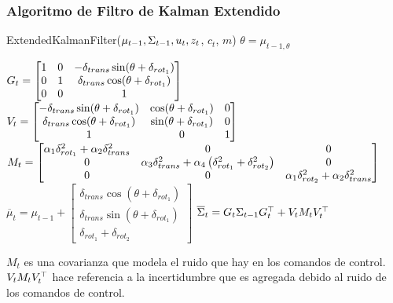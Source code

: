 \begin{frame}
    \frametitle{Algoritmo de Filtro de Kalman Extendido}
    \footnotesize
     \begin{algorithmic}[1]
        \State ExtendedKalmanFilter({$\mu_{t-1}, \Sigma_{t-1}, u_{t}, z_{t}$, $c_{t}$, $m$})
        \State $\theta = \mu_{t-1,\theta}$
        
        \State $
            G_{t} = 
            \begin{bmatrix}
                1 & 0 & -\delta_{trans} \sin(\theta + \delta_{rot_{1}})\\
                0 & 1 & \delta_{trans} \cos(\theta + \delta_{rot_{1}})\\
                0 & 0 & 1\\
            \end{bmatrix}
               $
        \State $
            V_{t} = 
            \begin{bmatrix}
                -\delta_{trans} \sin(\theta + \delta_{rot_{1}}) & \cos(\theta + \delta_{rot_{1}}) & 0\\
                \delta_{trans} \cos(\theta + \delta_{rot_{1}}) & \sin(\theta + \delta_{rot_{1}}) & 0\\
                1 & 0 & 1\\
            \end{bmatrix}
                $
        \State $
            M_{t} = 
            \begin{bmatrix}
                \alpha_{1}\delta^{2}_{rot_{1}} + \alpha_{2}\delta^{2}_{trans} & 0 & 0\\
                0 & \alpha_{3} \delta^{2}_{trans} + \alpha_{4} \left( \delta^{2}_{rot_{1}} + \delta^{2}_{rot_{2}} \right) & 0\\
                0 & 0 & \alpha_{1}\delta^{2}_{rot_{2}} + \alpha_{2}\delta^{2}_{trans}\\
            \end{bmatrix}
              $
        \State $\overline{\mu}_{t} = \mu_{t-1} + 
            \begin{bmatrix}
            \delta_{trans}\cos(\theta+\delta_{rot_{1}}) \\
            \delta_{trans}\sin(\theta+\delta_{rot_{1}}) \\
            \delta_{rot_{1}} + \delta_{rot_{2}}
        \end{bmatrix}$
        \State $\overline{\Sigma}_{t} = G_{t} \Sigma_{t-1} G_{t}^{\top}+V_{t} M_{t} V_{t}^{\top}$ 
    \end{algorithmic}
    \vspace{1em}
    $M_{t}$ es una covarianza que modela el ruido que hay en los comandos de control.
    $V_{t} M_{t} V_{t}^{\top}$ hace referencia a la incertidumbre que es agregada debido al ruido de los comandos de control.
    
\end{frame}

